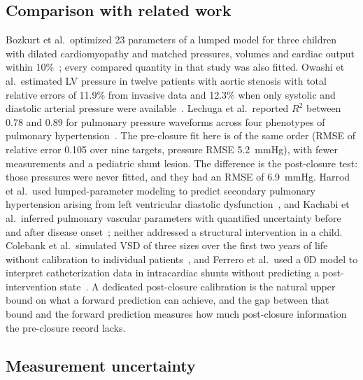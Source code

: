 \documentclass{article}
\begin{document}
\subsection{Comparison with related work}
Bozkurt et al.\ optimized 23 parameters of a lumped model for three children with dilated cardiomyopathy and matched pressures, volumes and cardiac output within 10\%~\cite{Bozkurt2022}; every compared quantity in that study was also fitted. Owashi et al.\ estimated LV pressure in twelve patients with aortic stenosis with total relative errors of 11.9\% from invasive data and 12.3\% when only systolic and diastolic arterial pressure were available~\cite{Owashi2020}. Lechuga et al.\ reported $R^2$ between 0.78 and 0.89 for pulmonary pressure waveforms across four phenotypes of pulmonary hypertension~\cite{Lechuga2026}. The pre-closure fit here is of the same order (RMSE of relative error 0.105 over nine targets, pressure RMSE 5.2~mmHg), with fewer measurements and a pediatric shunt lesion. The difference is the post-closure test: those pressures were never fitted, and they had an RMSE of 6.9~mmHg. Harrod et al.\ used lumped-parameter modeling to predict secondary pulmonary hypertension arising from left ventricular diastolic dysfunction~\cite{Harrod2021}, and Kachabi et al.\ inferred pulmonary vascular parameters with quantified uncertainty before and after disease onset~\cite{Kachabi2025}; neither addressed a structural intervention in a child. Colebank et al.\ simulated VSD of three sizes over the first two years of life without calibration to individual patients~\cite{Colebank2026}, and Ferrero et al.\ used a 0D model to interpret catheterization data in intracardiac shunts without predicting a post-intervention state~\cite{Ferrero2026Shunts}. A dedicated post-closure calibration is the natural upper bound on what a forward prediction can achieve, and the gap between that bound and the forward prediction measures how much post-closure information the pre-closure record lacks.

\subsection{Measurement uncertainty}


\end{document}

